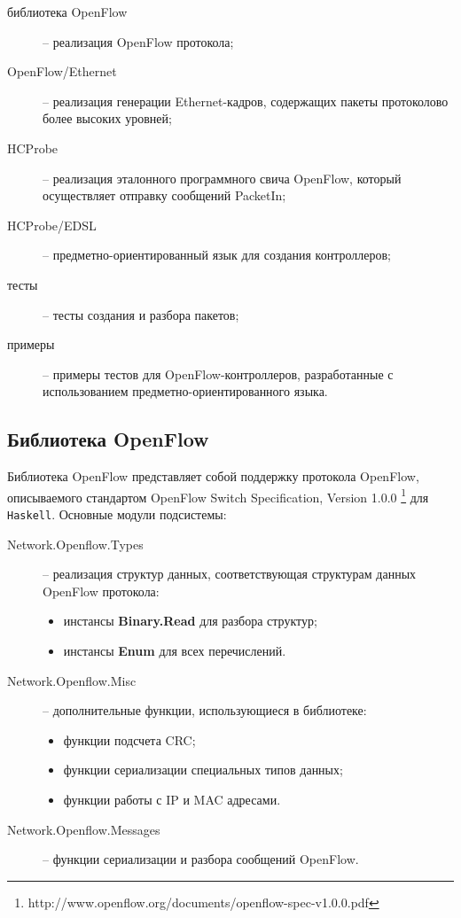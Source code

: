 \documentclass[9pt,a4paper]{article}
\begin{document}
\begin{description}
    \item[библиотека OpenFlow] -- реализация OpenFlow протокола;
    \item[OpenFlow/Ethernet] -- реализация генерации Ethernet-кадров, содержащих
      пакеты протоколово более высоких уровней;
    \item[HCProbe] -- реализация эталонного программного свича OpenFlow, который
      осуществляет отправку сообщений PacketIn;
    \item[HCProbe/EDSL] -- предметно-ориентированный язык для создания
      контроллеров;
    \item[тесты] -- тесты создания и разбора пакетов;
    \item[примеры] -- примеры тестов для OpenFlow-контроллеров, разработанные с
      использованием предметно-ориентированного языка.
\end{description}


\subsection{Библиотека OpenFlow}

Библиотека OpenFlow представляет собой поддержку протокола OpenFlow,
описываемого стандартом OpenFlow Switch Specification, Version 1.0.0
\footnote{http://www.openflow.org/documents/openflow-spec-v1.0.0.pdf} для
\texttt{Haskell}. Основные модули подсистемы:

\begin{description}
    \item[Network.Openflow.Types] -- реализация структур данных, соответствующая
      структурам данных OpenFlow протокола:
        \begin{itemize}
            \item инстансы \textbf{Binary.Read} для разбора структур;
            \item инстансы \textbf{Enum} для всех перечислений.
        \end{itemize}
    \item[Network.Openflow.Misc] -- дополнительные функции, использующиеся в
      библиотеке:
        \begin{itemize}
            \item функции подсчета CRC;
            \item функции сериализации специальных типов данных;
            \item функции работы с IP и MAC адресами.
        \end{itemize}
    \item[Network.Openflow.Messages] -- функции сериализации и разбора сообщений
      OpenFlow.
\end{description}
\end{document}
